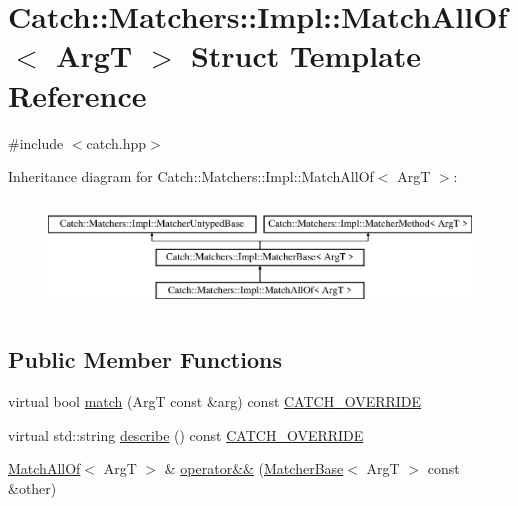 \hypertarget{structCatch_1_1Matchers_1_1Impl_1_1MatchAllOf}{\section{Catch\-:\-:Matchers\-:\-:Impl\-:\-:Match\-All\-Of$<$ Arg\-T $>$ Struct Template Reference}
\label{structCatch_1_1Matchers_1_1Impl_1_1MatchAllOf}
}


{\ttfamily \#include $<$catch.\-hpp$>$}

Inheritance diagram for Catch\-:\-:Matchers\-:\-:Impl\-:\-:Match\-All\-Of$<$ Arg\-T $>$\-:\begin{figure}[H]
\begin{center}
\leavevmode
\includegraphics[height=2.926829cm]{structCatch_1_1Matchers_1_1Impl_1_1MatchAllOf}
\end{center}
\end{figure}
\subsection*{Public Member Functions}
\begin{DoxyCompactItemize}
\item 
virtual bool \hyperlink{structCatch_1_1Matchers_1_1Impl_1_1MatchAllOf_a7bf0c2d8cedf67ecf9d0a527cb5a8263}{match} (Arg\-T const \&arg) const \hyperlink{catch_8hpp_a8ecdce4d3f57835f707915ae831eb847}{C\-A\-T\-C\-H\-\_\-\-O\-V\-E\-R\-R\-I\-D\-E}
\item 
virtual std\-::string \hyperlink{structCatch_1_1Matchers_1_1Impl_1_1MatchAllOf_aaefeba99a0b35425203468a65bff544b}{describe} () const \hyperlink{catch_8hpp_a8ecdce4d3f57835f707915ae831eb847}{C\-A\-T\-C\-H\-\_\-\-O\-V\-E\-R\-R\-I\-D\-E}
\item 
\hyperlink{structCatch_1_1Matchers_1_1Impl_1_1MatchAllOf}{Match\-All\-Of}$<$ Arg\-T $>$ \& \hyperlink{structCatch_1_1Matchers_1_1Impl_1_1MatchAllOf_a3844f9fb55f7a77155576ddc1e3f90d7}{operator\&\&} (\hyperlink{structCatch_1_1Matchers_1_1Impl_1_1MatcherBase}{Matcher\-Base}$<$ Arg\-T $>$ const \&other)
\end{DoxyCompactItemize}
